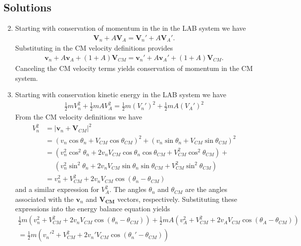 \documentclass[11pt]{article}
\renewcommand\vec{\mathbf}
\begin{document}
\subsection{Solutions}
\label{sec:orgheadline12}
\begin{enumerate}
\setcounter{enumi}{1}
\item Starting with conservation of momentum in the in the LAB system we have
\begin{align}
  \vec{V}_n + A \vec{V}_A = \vec{V}_n' + A \vec{V}_A'.
\end{align}
Substituting in the CM velocity definitions provides
\begin{align}
  \vec{v}_n + A \vec{v}_A + (1+A) \vec{V}_{CM} = \vec{v}_n' + A \vec{v}_A' + (1+A) \vec{V}_{CM}.
\end{align}
Canceling the CM velocity terms yields conservation of momentum in the CM system.
\item Starting with conservation kinetic energy in the LAB system we have
\begin{align}
  \frac{1}{2} m V_n^2 + \frac{1}{2}mA V_A^2 = \frac{1}{2} m (V_n')^2 + \frac{1}{2}mA (V_A')^2 
\end{align}
From the CM velocity definitions we have
\begin{align}
  V_n^2 &= \left| \vec{v}_n + \vec{V}_{CM} \right|^2 \\
        &= \left( v_n \cos\theta_n + V_{CM} \cos\theta_{CM} \right)^2 +
           \left( v_n \sin\theta_n + V_{CM} \sin\theta_{CM} \right)^2 \\
        &= \left( v_n^2 \cos^2\theta_n + 2 v_n V_{CM} \cos\theta_n \cos\theta_{CM} + V_{CM}^2 \cos^2\theta_{CM} \right) + \\
        &\phantom{=} \left( v_n^2 \sin^2\theta_n + 2 v_n V_{CM} \sin\theta_n \sin\theta_{CM} + V_{CM}^2 \sin^2\theta_{CM} \right) \\
        &= v_n^2 + V_{CM}^2 + 2 v_n V_{CM} \cos(\theta_n-\theta_{CM})
\end{align}
and a similar expression for \(V_A^2\).  The angles \(\theta_n\) and \(\theta_{CM}\) are the angles associated with the \(\vec{v}_n\) and \(\vec{V_{CM}}\) vectors, respectively.  Substituting these expressions into the energy balance equation yields
\begin{align}
  \frac{1}{2} m (v_n^2 + V_{CM}^2 + 2 v_n V_{CM} \cos(\theta_n-\theta_{CM})) 
+ \frac{1}{2}mA (v_A^2 + V_{CM}^2 + 2 v_A V_{CM} \cos(\theta_A-\theta_{CM})) \\
= \frac{1}{2} m (v_n'^2 + V_{CM}^2 + 2 v_n' V_{CM} \cos(\theta_n'-\theta_{CM}))

\end{align}
\end{enumerate}
\end{document}
